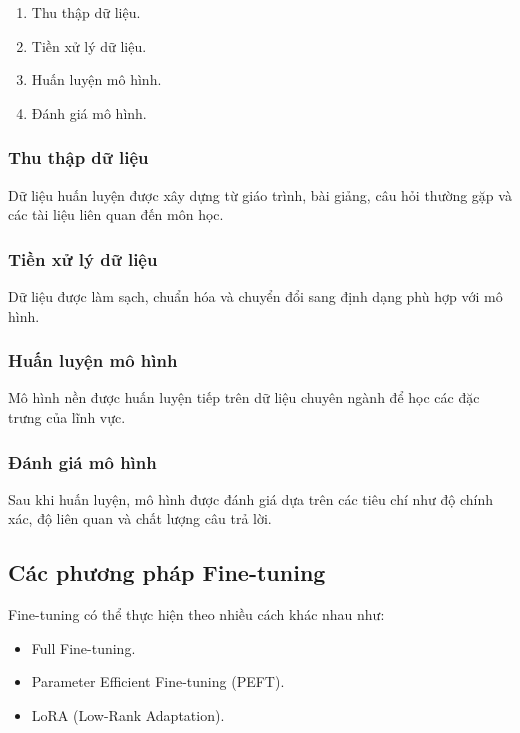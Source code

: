 \documentclass[12pt,a4paper]{report}
\begin{document}
	\begin{enumerate}
		\item Thu thập dữ liệu.
		\item Tiền xử lý dữ liệu.
		\item Huấn luyện mô hình.
		\item Đánh giá mô hình.
	\end{enumerate}
	
	\subsubsection{Thu thập dữ liệu}
	
	Dữ liệu huấn luyện được xây dựng từ giáo trình, bài giảng, câu hỏi thường gặp và các tài liệu liên quan đến môn học.
	
	\subsubsection{Tiền xử lý dữ liệu}
	
	Dữ liệu được làm sạch, chuẩn hóa và chuyển đổi sang định dạng phù hợp với mô hình.
	
	\subsubsection{Huấn luyện mô hình}
	
	Mô hình nền được huấn luyện tiếp trên dữ liệu chuyên ngành để học các đặc trưng của lĩnh vực.
	
	\subsubsection{Đánh giá mô hình}
	
	Sau khi huấn luyện, mô hình được đánh giá dựa trên các tiêu chí như độ chính xác, độ liên quan và chất lượng câu trả lời.
	
	\subsection{Các phương pháp Fine-tuning}
	
	Fine-tuning có thể thực hiện theo nhiều cách khác nhau như:
	
	\begin{itemize}
		\item Full Fine-tuning.
		\item Parameter Efficient Fine-tuning (PEFT).
		\item LoRA (Low-Rank Adaptation).
	\end{itemize}
	
\end{document}
